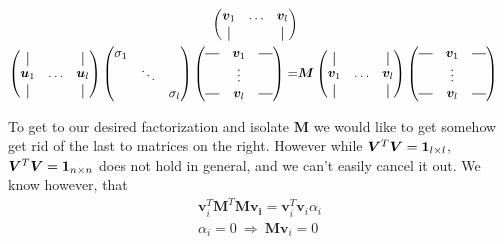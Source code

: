 \begin{align}
\begin{pmatrix}
        \bm{v}_1 & \hdots & \bm{v}_l \\
        \vertbar &        & \vertbar 
        \end{pmatrix} \\
        \begin{pmatrix}
        \vertbar &        & \vertbar \\
        \bm{u}_1 & \hdots & \bm{u}_l \\
        \vertbar &        & \vertbar 
        \end{pmatrix}
        \begin{pmatrix}
            \sigma_1 &        &          \\
                     & \ddots &          \\ 
                     &        & \sigma_l
        \end{pmatrix}
        \begin{pmatrix}
            \horzbar & \bm{v}_1 & \horzbar \\
                      & \vdots   &  \\
            \horzbar & \bm{v}_l &  \horzbar \\
        \end{pmatrix} 
        =&
        \bm{M}
        \begin{pmatrix}
        \vertbar &        & \vertbar \\
        \bm{v}_1 & \hdots & \bm{v}_l \\
        \vertbar &        & \vertbar 
        \end{pmatrix}
        \begin{pmatrix}
            \horzbar & \bm{v}_1 & \horzbar \\
                      & \vdots   &  \\
            \horzbar & \bm{v}_l &  \horzbar \\
        \end{pmatrix} 
    \end{align}
    
    To get to our desired factorization and isolate $\bm{M}$ we would like to get somehow get rid of the last to matrices on the right.
    However while $\bm{V}^T \bm{V} = \bm{1}_{l \times l}$, $\bm{V}^T \bm{V} = \bm{1}_{n \times n}$ does not hold in general, and we can't easily 
    cancel it out.
    We know however, that 
    \begin{align}
        \bm{v}_i^T \bm{M}^T \bm{M} \bm{v_i} =  \bm{v}_i^T \bm{v}_i \alpha_i \\
        \alpha_i = 0 \ \Rightarrow \ \bm{Mv}_i = 0
    \end{align}
    \allowdisplaybreaks
    
